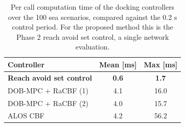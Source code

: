 \documentclass[5p,times,authoryear]{elsarticle}
\begin{document}
\begin{table}[t]
  \centering
  \caption{Per call computation time of the docking controllers over the 100 sea scenarios, compared against the 0.2 s control period. For the proposed method this is the Phase 2 reach avoid set control, a single network evaluation.}
  \label{tab_compute}
  \begin{tabular}{lcc}
    \hline
    Controller & Mean [ms] & Max [ms] \\
    \hline
    \textbf{Reach avoid set control} & \textbf{0.6} & \textbf{1.7} \\
    DOB-MPC + RaCBF (1) & 4.1 & 16.0 \\
    DOB-MPC + RaCBF (2) & 4.0 & 15.7 \\
    ALOS CBF & 4.2 & 56.2 \\
    \hline
  \end{tabular}
\end{table}







\begin{table}[t]
\centering
\renewcommand{\arraystretch}{1.2}
\caption{Physical and hydrodynamic parameters of the USV.}
\label{tab_params}
\end{table}
\end{document}
